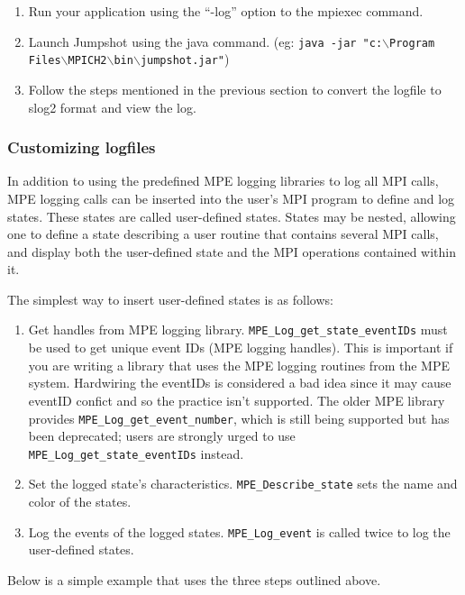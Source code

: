 \documentclass[dvipdfm,11pt]{article}
\begin{document}
\begin{enumerate}
	\item Run your application using the ``-log'' option to the mpiexec command. 

	\item Launch Jumpshot using the java command. 
(eg: \texttt{java -jar "c:$\backslash$Program Files$\backslash$MPICH2$\backslash$bin$\backslash$jumpshot.jar"})
	\item Follow the steps mentioned in the previous section to convert the logfile to slog2
			format and view the log.
\end{enumerate}

\subsubsection{Customizing logfiles}
In addition to using the predefined MPE logging libraries to log all MPI
calls, MPE logging calls can be inserted into the user's MPI program to define
and log states.  These states are called user-defined states.  States may
be nested, allowing one to define a state describing a user routine that
contains several MPI calls, and display both the user-defined state and
the MPI operations contained within it.

The simplest way to insert user-defined states is as follows:
\begin{enumerate}
\item Get handles from MPE logging library. \texttt{MPE\_Log\_get\_state\_eventIDs}
   must be used to get unique event IDs (MPE logging handles).
   This is important if you are writing a library that uses
   the MPE logging routines from the MPE system.
   Hardwiring the eventIDs is considered a bad idea since it may cause
   eventID confict and so the practice isn't supported. The older MPE library
   provides \texttt{MPE\_Log\_get\_event\_number}, which is still being supported but
   has been deprecated; users are strongly urged to use
   \texttt{MPE\_Log\_get\_state\_eventIDs} instead.

\item Set the logged state's characteristics. \texttt{MPE\_Describe\_state} sets the
   name and color of the states.

\item Log the events of the logged states. \texttt{MPE\_Log\_event} is called twice
   to log the user-defined states.
\end{enumerate}

Below is a simple example that uses the three steps outlined above.
\end{document}
